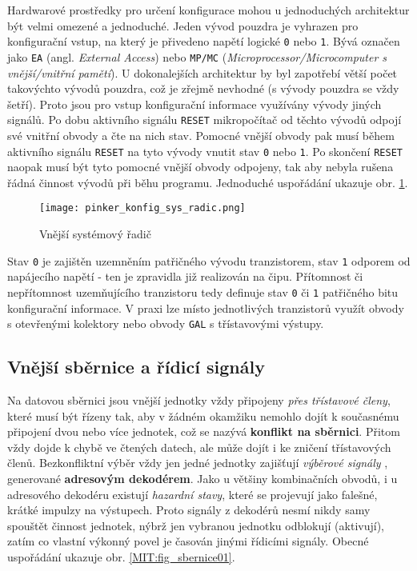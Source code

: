       Hardwarové prostředky pro určení konfigurace mohou u jednoduchých architektur být velmi 
      omezené a jednoduché. Jeden vývod pouzdra je vyhrazen pro konfigurační vstup, na který je 
      přivedeno napětí logické \texttt{0} nebo \texttt{1}. Bývá označen jako \texttt{EA} (angl. 
      \emph{External Access}) nebo \texttt{MP/MC} (\emph{Microprocessor/Microcomputer s 
      vnější/vnitřní pamětí}). U dokonalejších architektur by byl zapotřebí větší počet takovýchto 
      vývodů pouzdra, což je zřejmě nevhodné (s vývody pouzdra se vždy šetří). Proto jsou pro vstup 
      konfigurační informace využívány vývody jiných signálů. Po dobu aktivního signálu 
      \texttt{RESET} mikropočítač od těchto vývodů odpojí své vnitřní obvody a čte na 
      nich stav. Pomocné vnější obvody pak musí během aktivního signálu \texttt{RESET} na tyto 
      vývody vnutit stav \texttt{0} nebo \texttt{1}. Po skončení \texttt{RESET} naopak musí být 
      tyto pomocné vnější obvody odpojeny, tak aby nebyla rušena řádná činnost vývodů při běhu 
      programu. Jednoduché uspořádání ukazuje obr. \ref{MIT:fig_konfig_sys_radic}.
    
      \begin{figure}[ht!] %
        \centering
        \texttt{[image: pinker\_konfig\_sys\_radic.png]}
        \caption{Vnější systémový řadič}
        \label{MIT:fig_konfig_sys_radic}
      \end{figure}
    
      Stav \texttt{0} je zajištěn uzemněním patřičného vývodu tranzistorem, stav \texttt{1} odporem 
      od napájecího napětí - ten je zpravidla již realizován na čipu. Přítomnost či nepřítomnost 
      uzemňujícího tranzistoru tedy definuje stav \texttt{0} či \texttt{1} patřičného bitu 
      konfigurační informace. V praxi lze místo jednotlivých tranzistorů využít obvody s otevřenými 
      kolektory nebo obvody \texttt{GAL} s třístavovými výstupy.
      
    \subsection{Vnější sběrnice a řídicí signály}\label{MIT:chap_extbus_sign}
      Na datovou sběrnici jsou vnější jednotky vždy připojeny \emph{přes třístavové členy}, které 
      musí být řízeny tak, aby v žádném okamžiku nemohlo dojít k současnému připojení dvou nebo 
      více jednotek, což se nazývá \textbf{konflikt na sběrnici}. Přitom vždy dojde k chybě ve 
      čtených datech, ale může dojít i ke zničení třístavových členů. Bezkonfliktní výběr vždy jen 
      jedné jednotky zajišťují \emph{výběrové signály} , generované 
      \textbf{adresovým dekodérem}. Jako u většiny kombinačních obvodů, i u adresového dekodéru 
      existují \emph{hazardní stavy}, které se projevují jako falešné, krátké impulzy na výstupech. 
      Proto signály z dekodérů nesmí nikdy samy spouštět činnost jednotek, nýbrž jen vybranou 
      jednotku odblokují (aktivují), zatím co vlastní výkonný povel je časován jinými řídicími 
      signály. Obecné uspořádání ukazuje obr. \ref{MIT:fig_sbernice01}.
 
